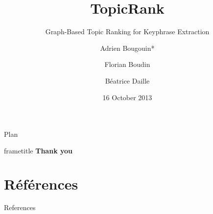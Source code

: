 \documentclass[14pt, xcolor={usenames, dvipsnames}]{beamer}
\title{TopicRank}
\subtitle{Graph-Based Topic Ranking for Keyphrase Extraction}
\author{Adrien Bougouin* \and Florian Boudin \and Béatrice Daille}
\institute{\normalsize{Université de Nantes, LINA, France}}
\date{16 October 2013}
\begin{document}
  \renewcommand*{\theenumii}{\alph{enumii}}
  \renewcommand*{\theenumiii}{\roman{enumiii}}

  \begin{frame}
    \titlepage
  \end{frame}
  \setcounter{framenumber}{0}

  
  
  
  \begin{frame}{Plan}
    \tableofcontents
  \end{frame}
  
  
  
  \begin{frame}
    \vfill
    \begin{beamercolorbox}[center,shadow=true,rounded=true]{frametitle} 
      \Huge{\textbf{Thank you}}
    \end{beamercolorbox} 
    \vfill
  \end{frame}
  
  \section*{Références}
    \begin{frame}[allowframebreaks]{References}
      \def\newblock{\hskip .11em plus .33em minus .07em}
      
      
    \end{frame}
\end{document}
